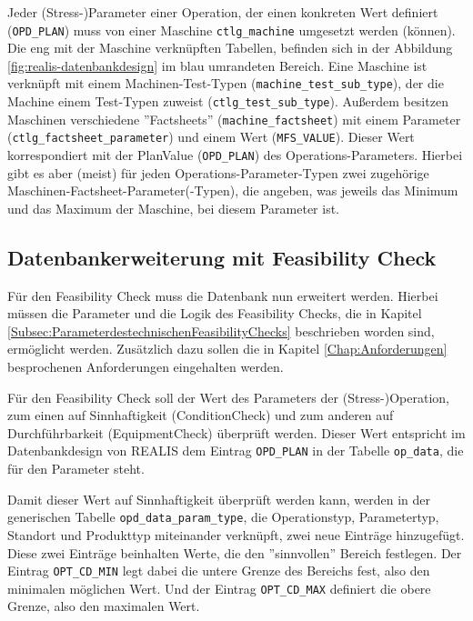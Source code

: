 Jeder (Stress-)Parameter einer Operation, der einen konkreten Wert definiert (\texttt{OPD\_PLAN}) muss von einer Maschine \texttt{ctlg\_machine} umgesetzt werden (können). Die eng mit der Maschine verknüpften Tabellen, befinden sich in der Abbildung \ref{fig:realis-datenbankdesign} im blau umrandeten Bereich. Eine Maschine ist verknüpft mit einem Machinen-Test-Typen (\texttt{machine\_test\_sub\_type}), der die Machine einem Test-Typen zuweist (\texttt{ctlg\_test\_sub\_type}). Außerdem besitzen Maschinen verschiedene ''Factsheets'' (\texttt{machine\_factsheet}) mit einem Parameter (\texttt{ctlg\_factsheet\_parameter}) und einem Wert (\texttt{MFS\_VALUE}). Dieser Wert korrespondiert mit der PlanValue (\texttt{OPD\_PLAN}) des Operations-Parameters. Hierbei gibt es aber (meist) für jeden Operations-Parameter-Typen zwei zugehörige Maschinen-Factsheet-Parameter(-Typen), die angeben, was jeweils das Minimum und das Maximum der Maschine, bei diesem Parameter ist.


\subsection{Datenbankerweiterung mit Feasibility Check}

Für den Feasibility Check muss die Datenbank nun erweitert werden. Hierbei müssen die Parameter und die Logik des Feasibility Checks, die in Kapitel \ref{Subsec:ParameterdestechnischenFeasibilityChecks} beschrieben worden sind, ermöglicht werden. Zusätzlich dazu sollen die in Kapitel \ref{Chap:Anforderungen} besprochenen Anforderungen eingehalten werden.

Für den Feasibility Check soll der Wert des Parameters der (Stress-)Operation, zum einen auf Sinnhaftigkeit (\gls{ConditionCheck}) und zum anderen auf Durchführbarkeit (\gls{EquipmentCheck}) überprüft werden. Dieser Wert entspricht im Datenbankdesign von \gls{REALIS} dem Eintrag \texttt{OPD\_PLAN} in der Tabelle \texttt{op\_data}, die für den Parameter steht.

Damit dieser Wert auf Sinnhaftigkeit überprüft werden kann, werden in der generischen Tabelle \texttt{opd\_data\_param\_type}, die Operationstyp, Parametertyp, Standort und Produkttyp miteinander verknüpft, zwei neue Einträge hinzugefügt. Diese zwei Einträge beinhalten Werte, die den ''sinnvollen'' Bereich festlegen. Der Eintrag \texttt{OPT\_CD\_MIN} legt dabei die untere Grenze des Bereichs fest, also den minimalen möglichen Wert. Und der Eintrag \texttt{OPT\_CD\_MAX} definiert die obere Grenze, also den maximalen Wert.

